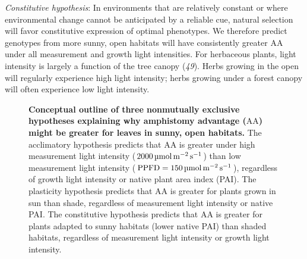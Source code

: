 \documentclass[
  letterpaper,
  DIV=11,
  numbers=noendperiod]{scrartcl}
\newcommand{\aax}{$\mathrm{AA}$}
\newcommand{\ppfdequals}[1]{$\mathrm{PPFD} = \qty{#1}{\micro\mol\raiseto{-2}\meter\raiseto{-1}\second}$}
\newcommand{\ppfdqty}[1]{$\qty{#1}{\micro\mol\raiseto{-2}\meter\raiseto{-1}\second}$}
\begin{document}
\emph{Constitutive hypothesis}: In environments that are relatively
constant or where environmental change cannot be anticipated by a
reliable cue, natural selection will favor constitutive expression of
optimal phenotypes. We therefore predict genotypes from more sunny, open
habitats will have consistently greater \aax{} under all measurement and
growth light intensities. For herbaceous plants, light intensity is
largely a function of the tree canopy (\emph{49}). Herbs growing in the
open will regularly experience high light intensity; herbs growing under
a forest canopy will often experience low light intensity.

\begin{figure}


\caption{\label{fig-concept}\textbf{Conceptual outline of three nonmutually exclusive hypotheses explaining why amphistomy advantage (\aax{}) might be greater for leaves in sunny, open habitats.}
The acclimatory hypothesis predicts that \aax{} is greater under high
measurement light intensity (\ppfdqty{2000}) than low measurement light
intensity (\ppfdequals{150}), regardless of growth light intensity or
native plant area index (PAI). The plasticity hypothesis predicts that
\aax{} is greater for plants grown in sun than shade, regardless of
measurement light intensity or native PAI. The constitutive hypothesis
predicts that \aax{} is greater for plants adapted to sunny habitats
(lower native PAI) than shaded habitats, regardless of measurement light
intensity or growth light intensity.}

\end{figure}%
\end{document}
